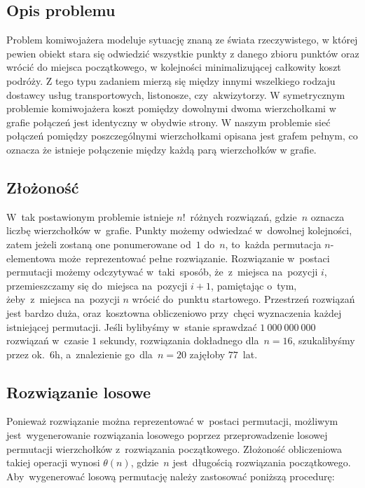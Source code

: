 \subsection{Opis problemu}

Problem komiwojażera modeluje sytuację znaną ze świata rzeczywistego, w której pewien obiekt stara się odwiedzić wszystkie punkty z danego zbioru punktów oraz wrócić do miejsca początkowego, w kolejności minimalizującej całkowity koszt podróży. Z tego typu zadaniem mierzą się między innymi wszelkiego rodzaju dostawcy usług transportowych, listonosze, czy~akwizytorzy. W symetrycznym problemie komiwojażera koszt pomiędzy dowolnymi dwoma wierzchołkami w grafie połączeń jest identyczny w obydwie strony. W naszym problemie sieć połączeń pomiędzy poszczególnymi wierzchołkami opisana jest grafem pełnym, co oznacza że istnieje połączenie między każdą parą wierzchołków w grafie.

\subsection{Złożoność}

W~tak postawionym problemie istnieje $n!$~różnych rozwiązań, gdzie~$n$ oznacza liczbę wierzchołków w~grafie. Punkty możemy odwiedzać w~dowolnej kolejności, zatem jeżeli zostaną one ponumerowane od~$1$ do~$n$, to~każda permutacja $n$-elementowa może~reprezentować pełne rozwiązanie. Rozwiązanie w~postaci permutacji możemy odczytywać w~taki~sposób, że~z~miejsca na~pozycji $i$, przemieszczamy się do~miejsca na~pozycji $i+1$, pamiętając o~tym, żeby~z~miejsca na~pozycji $n$ wrócić do~punktu startowego. Przestrzeń rozwiązań jest bardzo duża, oraz~kosztowna obliczeniowo przy~chęci wyznaczenia każdej istniejącej permutacji. Jeśli bylibyśmy w~stanie sprawdzać $1\ 000\ 000\ 000$ rozwiązań w~czasie $1$ sekundy, rozwiązania dokładnego dla~$n=16$, szukalibyśmy przez ok.~$6$h, a~znalezienie go~dla~$n=20$ zajęłoby $77$~lat.

\subsection{Rozwiązanie losowe}

Ponieważ rozwiązanie można reprezentować w~postaci permutacji, możliwym jest~wygenerowanie rozwiązania losowego poprzez przeprowadzenie losowej permutacji wierzchołków z~rozwiązania początkowego. Złożoność obliczeniowa takiej operacji wynosi $\theta(n)$, gdzie~$n$ jest~długością rozwiązania początkowego. Aby~wygenerować losową permutację należy zastosować poniższą procedurę:

